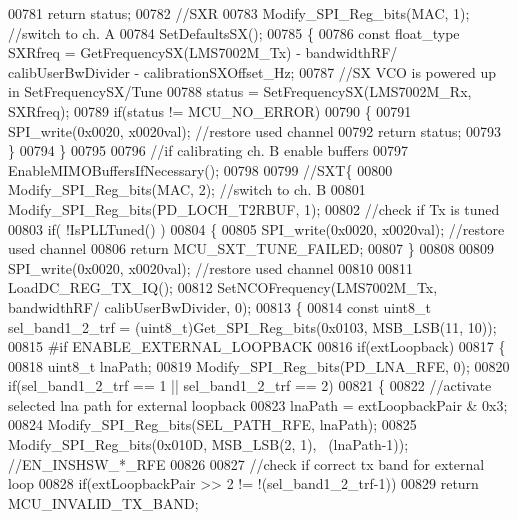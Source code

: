 \begin{DoxyCode}
{{{{{{{{{{{{{{{{00781         \textcolor{keywordflow}{return} status;
00782     \textcolor{comment}{//SXR}
00783     Modify_SPI_Reg_bits(MAC, 1); \textcolor{comment}{//switch to ch. A}
00784     SetDefaultsSX();
00785     \{
00786         \textcolor{keyword}{const} float_type SXRfreq = GetFrequencySX(LMS7002M_Tx) - bandwidthRF/ 
      calibUserBwDivider - calibrationSXOffset_Hz;
00787         \textcolor{comment}{//SX VCO is powered up in SetFrequencySX/Tune}
00788         status = SetFrequencySX(LMS7002M_Rx, SXRfreq);
00789         \textcolor{keywordflow}{if}(status != MCU_NO_ERROR)
00790         \{
00791             SPI_write(0x0020, x0020val); \textcolor{comment}{//restore used channel}
00792             \textcolor{keywordflow}{return} status;
00793         \}
00794     \}
00795 
00796     \textcolor{comment}{//if calibrating ch. B enable buffers}
00797     EnableMIMOBuffersIfNecessary();
00798 
00799     \textcolor{comment}{//SXT\{}
00800     Modify_SPI_Reg_bits(MAC, 2); \textcolor{comment}{//switch to ch. B}
00801     Modify_SPI_Reg_bits(PD_LOCH_T2RBUF, 1);
00802     \textcolor{comment}{//check if Tx is tuned}
00803     \textcolor{keywordflow}{if}( !IsPLLTuned() )
00804     \{
00805         SPI_write(0x0020, x0020val); \textcolor{comment}{//restore used channel}
00806         \textcolor{keywordflow}{return} MCU_SXT_TUNE_FAILED;
00807     \}
00808 
00809     SPI_write(0x0020, x0020val); \textcolor{comment}{//restore used channel}
00810 
00811     LoadDC_REG_TX_IQ();
00812     SetNCOFrequency(LMS7002M_Tx, bandwidthRF/ calibUserBwDivider, 0);
00813     \{
00814         \textcolor{keyword}{const} uint8\_t sel\_band1\_2\_trf = (uint8\_t)Get_SPI_Reg_bits(0x0103, 
      MSB_LSB(11, 10));
00815 \textcolor{preprocessor}{#if ENABLE\_EXTERNAL\_LOOPBACK}
00816         \textcolor{keywordflow}{if}(extLoopback)
00817         \{
00818             uint8\_t lnaPath;
00819             Modify_SPI_Reg_bits(PD_LNA_RFE, 0);
00820             \textcolor{keywordflow}{if}(sel\_band1\_2\_trf == 1 || sel\_band1\_2\_trf == 2)
00821             \{
00822                 \textcolor{comment}{//activate selected lna path for external loopback}
00823                 lnaPath = extLoopbackPair & 0x3;
00824                 Modify_SPI_Reg_bits(SEL_PATH_RFE, lnaPath);
00825                 Modify_SPI_Reg_bits(0x010D, MSB_LSB(2, 1), ~(lnaPath-1)); \textcolor{comment}{//EN\_INSHSW\_*\_RFE}
00826 
00827                 \textcolor{comment}{//check if correct tx band for external loop}
00828                 \textcolor{keywordflow}{if}(extLoopbackPair >> 2 != !(sel\_band1\_2\_trf-1))
00829                     \textcolor{keywordflow}{return} MCU_INVALID_TX_BAND;
}}}}}}}}}}}}}}}}
\end{DoxyCode}
